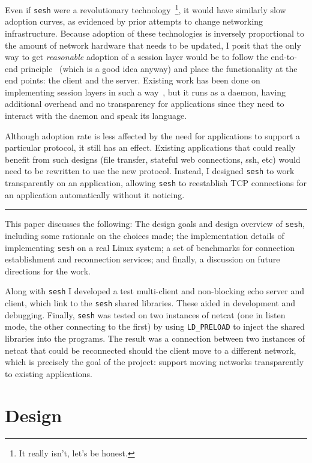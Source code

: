 \documentclass[twocolumn,11pt]{article}
\newcommand{\sesh}{\texttt{sesh}\xspace}
\begin{document}
Even if \sesh were a revolutionary technology~\footnote{It really isn't, let's
be honest.}, it would have similarly slow adoption curves, as evidenced by prior
attempts to change networking infrastructure. Because adoption of these
technologies is inversely proportional to the amount of network hardware that
needs to be updated, I posit that the only way to get \textit{reasonable}
adoption of a session layer would be to follow the end-to-end
principle~\cite{Saltzer} (which is a good idea anyway) and place the
functionality at the end points: the client and the server. Existing work has
been done on implementing session layers in such a way~\cite{wasptr-15-01}, but
it runs as a daemon, having additional overhead and no transparency for
applications since they need to interact with the daemon and speak its language.

Although adoption rate is less affected by the need for applications to support
a particular protocol, it still has an effect. Existing applications that could
really benefit from such designs (file transfer, stateful web connections, ssh,
etc) would need to be rewritten to use the new protocol. Instead, I designed
\sesh to work transparently on an application, allowing \sesh to
reestablish TCP connections for an application automatically without it noticing.

\begin{center}\rule{2cm}{0.1pt}\end{center}

This paper discusses the following: The design goals and design overview of
\sesh, including some rationale on the choices made; the implementation details
of implementing \sesh on a real Linux system; a set of benchmarks for connection
establishment and reconnection services; and finally, a discussion on future
directions for the work.

Along with \sesh I developed a test multi-client and non-blocking echo server
and client, which link to the \sesh shared libraries. These aided in development
and debugging. Finally, \sesh was tested on two instances of netcat (one in
listen mode, the other connecting to the first) by using \texttt{LD\_PRELOAD} to
inject the shared libraries into the programs. The result was a connection
between two instances of netcat that could be reconnected should the client move
to a different network, which is precisely the goal of the project: support
moving networks transparently to existing applications.

\section{Design}
\end{document}
